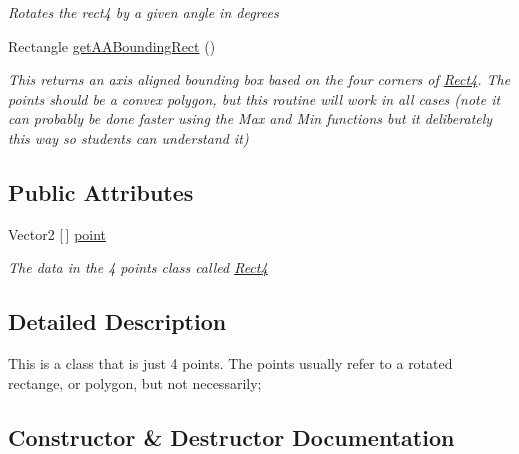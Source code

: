 \begin{DoxyCompactItemize}
\begin{DoxyCompactList}\small\item\em Rotates the rect4 by a given angle in degrees \end{DoxyCompactList}\item 
Rectangle \mbox{\hyperlink{class_r_c___framework_1_1_rect4_a7b2896ea0757990f273214550111770d}{get\+A\+A\+Bounding\+Rect}} ()
\begin{DoxyCompactList}\small\item\em This returns an axis aligned bounding box based on the four corners of \mbox{\hyperlink{class_r_c___framework_1_1_rect4}{Rect4}}. The points should be a convex polygon, but this routine will work in all cases (note it can probably be done faster using the Max and Min functions but it deliberately this way so students can understand it) \end{DoxyCompactList}\end{DoxyCompactItemize}
\subsection*{Public Attributes}
\begin{DoxyCompactItemize}
\item 
Vector2 \mbox{[}$\,$\mbox{]} \mbox{\hyperlink{class_r_c___framework_1_1_rect4_a79615c1338cf98e83e9caeea09c69390}{point}}
\begin{DoxyCompactList}\small\item\em The data in the 4 points class called \mbox{\hyperlink{class_r_c___framework_1_1_rect4}{Rect4}} \end{DoxyCompactList}\end{DoxyCompactItemize}


\subsection{Detailed Description}
This is a class that is just 4 points. The points usually refer to a rotated rectange, or polygon, but not necessarily; 



\subsection{Constructor \& Destructor Documentation}
\mbox{\label{class_r_c___framework_1_1_rect4_af2a81f571eade3c6ff1ddf0c7197dbc0}} 
